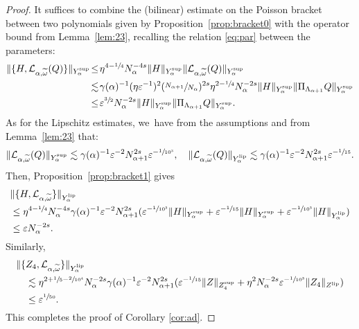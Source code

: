 \documentclass[10pt,a4paper]{amsart}
\theoremstyle{plain}
\theoremstyle{definition}
\newcommand{\1}{\mathbf{1}}
\newcommand{\Ysup}[1]{Y_{#1}^{\mathrm{sup}}}
\newcommand{\Ylip}[1]{Y_{#1}^{\mathrm{lip}}}
\let\epsilon\varepsilon
\begin{document}
\begin{proof}
It suffices to combine the (bilinear) estimate on the Poisson bracket between two polynomials given by Proposition~\ref{prop:bracket0} with the operator bound from Lemma~\ref{lem:23}, recalling the relation \ref{eq:par} between the parameters:
\begin{align*}
\|\{H,\mathcal{L}_{\alpha,\widetilde{\omega}}(Q)\}\|_{\Ysup{\alpha}}
&\!\leq\!
\eta^{4-\sfrac{1}{4}}N_{\alpha}^{-4s}
\|H\|_{\Ysup{\alpha}}
\|
\mathcal{L}_{\alpha,\widetilde{\omega}}(Q)
\|_{\Ysup{\alpha}} \\
&\!\lesssim\!
\gamma(\alpha)^{-1}(\eta\epsilon^{-1})^{2}(\sfrac{N_{\alpha+1}}{N_{\alpha}})^{2s}\eta^{2-\sfrac{1}{4}}N_{\alpha}^{-2s}
\|H\|_{\Ysup{\alpha}}
\|\Pi_{\Lambda_{\alpha+1}}Q\|_{\Ysup{\alpha}} \\
&\!\leq\!
\epsilon^{\sfrac{3}{2}}N_{\alpha}^{-2s}
\|H\|_{\Ysup{\alpha}}
\|\Pi_{\Lambda_{\alpha+1}}Q\|_{\Ysup{\alpha}}.
\end{align*}
As for the Lipschitz estimates, we~have from the assumptions and from Lemma~\ref{lem:23} that:
\[
\|
\mathcal{L}_{\alpha,\widetilde{\omega}}(Q)
\|_{\Ysup{\alpha}}
\lesssim \gamma(\alpha)^{-1}\epsilon^{-2}N_{\alpha+1}^{2s}\epsilon^{-\sfrac{1}{10^{3}}},
\quad
\|
\mathcal{L}_{\alpha,\widetilde{\omega}}(Q)
\|_{\Ylip{\alpha}}
\lesssim
\gamma(\alpha)^{-1}\epsilon^{-2}N_{\alpha+1}^{2s}\epsilon^{-\sfrac{1}{15}}.
\]
Then, Proposition~\ref{prop:bracket1} gives
\begin{align*}
&\|\{H,\mathcal{L}_{\alpha,\widetilde{\omega}}\}\|_{\Ylip{\alpha}} \\
&\leq \eta^{4-\sfrac{1}{4}}N_{\alpha}^{-4s}
\gamma(\alpha)^{-1}\epsilon^{-2}N_{\alpha+1}^{2s}(
\epsilon^{-\sfrac{1}{10^{3}}}\|H\|_{\Ysup{\alpha}}
+
\epsilon^{-\sfrac{1}{15}}
\|H\|_{\Ysup{\alpha}}
+
\epsilon^{-\sfrac{1}{10^{3}}}
\|H\|_{\Ylip{\alpha}}
)\\
&\leq
\epsilon N_{\alpha}^{-2s}.
\end{align*}
Similarly,
\begin{align*}
\|\{&Z_{4},\mathcal{L}_{\alpha,\widetilde{\omega}}\}\|_{\Ylip{\alpha}} \\
&\lesssim \eta^{2+\sfrac{1}{5}-\sfrac{2}{10^{4}}}N_{\alpha}^{-2s}
\gamma(\alpha)^{-1}\epsilon^{-2}N_{\alpha+1}^{2s}
(
\epsilon^{-\sfrac{1}{15}}\|Z\|_{Z_{4}^{\mathrm{sup}}}
+\eta^{2}N_{\alpha}^{-2s}\epsilon^{-\sfrac{1}{10^{3}}}\|Z_{4}\|_{Z^{\mathrm{lip}}})\\
&\leq\epsilon^{\sfrac{1}{50}}.
\end{align*}
This completes the proof of Corollary \ref{cor:ad}.
\end{proof}
\end{document}
